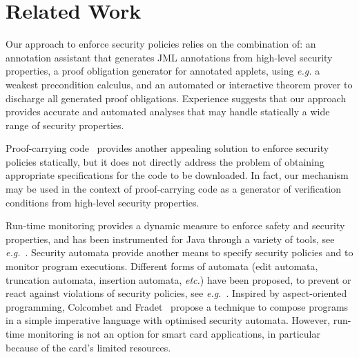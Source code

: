 \section{Related Work}\label{SecRelated}

Our approach to enforce security policies relies on the combination of:
an annotation assistant that generates JML annotations from 
high-level security properties,
a proof obligation generator for annotated
applets, using \emph{e.g.} a weakest precondition calculus, and
an automated or interactive theorem prover to discharge all 
generated proof obligations.
Experience suggests that our approach provides accurate and automated
analyses that may handle statically a wide range of security properties. 

Proof-carrying code~\cite{Necula97} provides another appealing
solution to enforce security policies statically, but it does not
directly address the problem of obtaining appropriate specifications
for the code to be downloaded.  In fact, our mechanism may be used in
the context of proof-carrying code as a generator of verification
conditions from high-level security properties.


Run-time monitoring provides a dynamic measure to enforce safety and
security properties, and has been instrumented for Java through a
variety of tools, see
\emph{e.g.}~\/\cite{bartetzko01assertions,BratKPV00,TKL03:rv}.
Security automata provide another means to specify security policies
and to monitor program executions. Different forms of automata (edit
automata, truncation automata, insertion automata, \emph{etc.}) have
been proposed, to prevent or react against violations of security
policies, see
\emph{e.g.}~\cite{Schneider99,wal00:popl,HMS03:tr,Erlingsson03}. Inspired
by aspect-oriented programming, Colcombet and Fradet~\cite{CF00:popl}
propose a technique to compose programs in a simple imperative
language with optimised security automata. However, run-time
monitoring is not an option for smart card applications, in particular
because of the card's limited resources.

